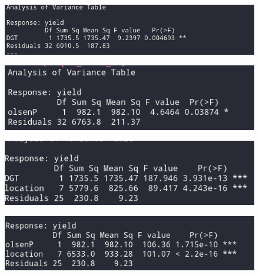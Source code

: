 \documentclass[12pt,fleqn]{article}
\begin{document}
\begin{figure}[H]
	\centering
	\includegraphics[width=.7\linewidth]{simpleDGT}
\end{figure}
\begin{figure}[H]
	\centering
	\includegraphics[width=.7\linewidth]{simpleOP}
\end{figure}
\begin{figure}[H]
	\centering
	\includegraphics[width=.7\linewidth]{anovaDGT}
\end{figure}
\begin{figure}[H]
	\centering
	\includegraphics[width=.7\linewidth]{anovaOP}
\end{figure}
\end{document}
